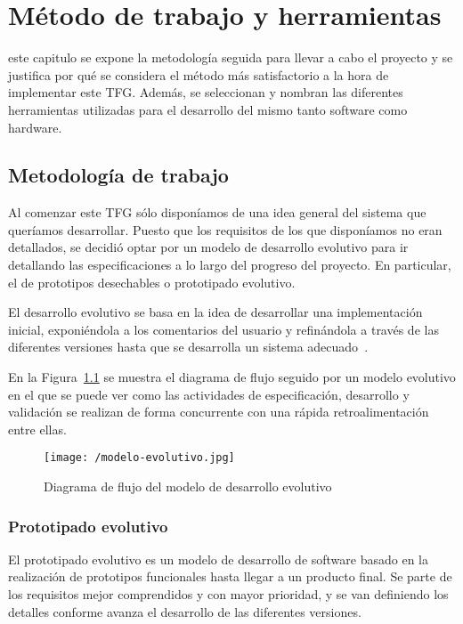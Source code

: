 \chapter{Método de trabajo y herramientas}
\label{chap:metodo}

 este capitulo se expone la metodología seguida para llevar a cabo el proyecto y se
justifica por qué se considera el método más satisfactorio a la hora de implementar este
\acs{TFG}. Además, se seleccionan y nombran las diferentes herramientas utilizadas para el
desarrollo del mismo tanto software como hardware.

\section{Metodología de trabajo}

Al comenzar este \acs{TFG} sólo disponíamos de una idea general del sistema que queríamos
desarrollar. Puesto que los requisitos de los que disponíamos no eran detallados, se decidió optar
por un modelo de desarrollo evolutivo para ir detallando las especificaciones a lo largo del
progreso del proyecto. En particular, el de prototipos desechables o prototipado evolutivo.

El desarrollo evolutivo se basa en la idea de desarrollar una implementación inicial, exponiéndola a
los comentarios del usuario y refinándola a través de las diferentes versiones hasta que se
desarrolla un sistema adecuado~\cite{Sommerville14}.

En la Figura~\ref{fig:modelo-evolutivo} se muestra el diagrama de flujo seguido por un modelo
evolutivo en el que se puede ver como las actividades de especificación, desarrollo y validación se
realizan de forma concurrente con una rápida retroalimentación entre ellas.

\begin{figure}[!h]
  \begin{center}
    \texttt{[image: /modelo-evolutivo.jpg]}
    \caption{Diagrama de flujo del modelo de desarrollo evolutivo}
    \label{fig:modelo-evolutivo}
  \end{center}
\end{figure}

\subsection{Prototipado evolutivo}

El prototipado evolutivo es un modelo de desarrollo de software basado en la realización de
prototipos funcionales hasta llegar a un producto final. Se parte de los requisitos mejor
comprendidos y con mayor prioridad, y se van definiendo los detalles conforme avanza el desarrollo
de las diferentes versiones.

